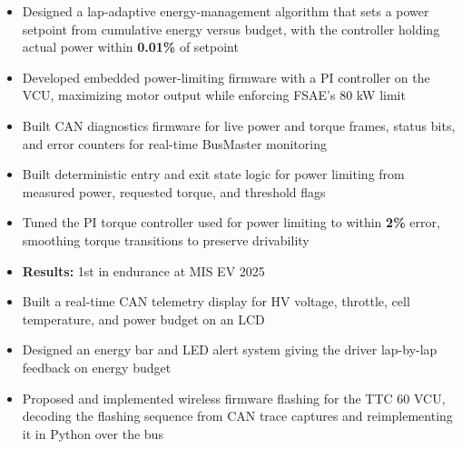 \documentclass[10pt,letterpaper]{article}
\begin{document}
\entryspace

\orgline{\spartanracing}
\begin{itemize}
  \item Designed a lap-adaptive energy-management algorithm that sets a power setpoint from cumulative energy versus budget, with the controller holding actual power within \textbf{0.01\%} of setpoint
  \item Developed embedded power-limiting firmware with a PI controller on the VCU, maximizing motor output while enforcing FSAE's 80 kW limit
  \item Built CAN diagnostics firmware for live power and torque frames, status bits, and error counters for real-time BusMaster monitoring
\end{itemize}

\entryspace

\orgline{\spartanracing}
\begin{itemize}
  \item Built deterministic entry and exit state logic for power limiting from measured power, requested torque, and threshold flags
  \item Tuned the PI torque controller used for power limiting to within \textbf{2\%} error, smoothing torque transitions to preserve drivability
  \item \textbf{Results:} 1st in endurance at MIS EV 2025
\end{itemize}


\orgline{\spartanracing}
\begin{itemize}
  \item Built a real-time CAN telemetry display for HV voltage, throttle, cell temperature, and power budget on an LCD
  \item Designed an energy bar and LED alert system giving the driver lap-by-lap feedback on energy budget
\end{itemize}

\entryspace

\begin{itemize}
  \item Proposed and implemented wireless firmware flashing for the TTC 60 VCU, decoding the flashing sequence from CAN trace captures and reimplementing it in Python over the bus
\end{itemize}
\end{document}
